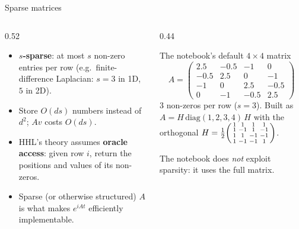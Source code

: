 \documentclass[aspectratio=169,11pt]{beamer}
\newcommand{\key}[1]{{\color{qdark}\textbf{#1}}}
\begin{document}
\begin{frame}{Sparse matrices}
  \begin{columns}[T]
    \begin{column}{0.52\textwidth}
      \begin{itemize}
        \item \key{$s$-sparse}: at most $s$ non-zero entries per row (e.g.\ finite-difference Laplacian: $s = 3$ in 1D, $5$ in 2D).
        \item Store $O(ds)$ numbers instead of $d^2$; $Av$ costs $O(ds)$.
        \item HHL's theory assumes \key{oracle access}: given row $i$, return the positions and values of its non-zeros.
        \item Sparse (or otherwise structured) $A$ is what makes $e^{iAt}$ efficiently implementable.
      \end{itemize}
    \end{column}
    \begin{column}{0.44\textwidth}
      \begin{exampleblock}{The notebook's default $4\times4$ matrix}
        \footnotesize
        \[ A = \begin{pmatrix} 2.5 & -0.5 & -1 & 0\\ -0.5 & 2.5 & 0 & -1\\ -1 & 0 & 2.5 & -0.5\\ 0 & -1 & -0.5 & 2.5\end{pmatrix} \]
        3 non-zeros per row ($s = 3$). Built as $A = H\,\mathrm{diag}(1, 2, 3, 4)\,H$ with the orthogonal $H = \frac12\begin{psmallmatrix}1&1&1&1\\1&-1&1&-1\\1&1&-1&-1\\1&-1&-1&1\end{psmallmatrix}$.
      \end{exampleblock}
      \small The notebook does \emph{not} exploit sparsity: it uses the full matrix.
    \end{column}
  \end{columns}
\end{frame}
\end{document}
